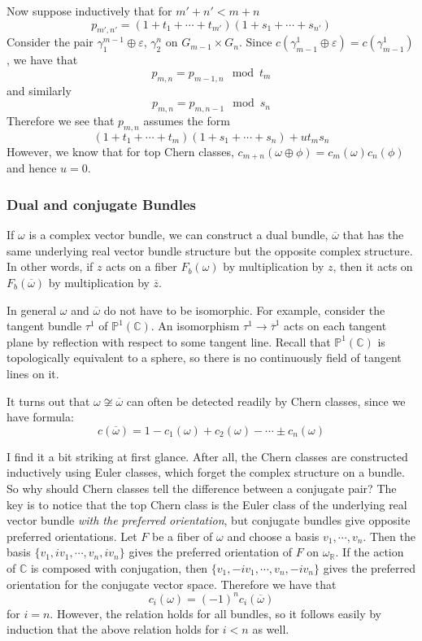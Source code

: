 \documentclass[12pt]{article}
\theoremstyle{plain}
\theoremstyle{definition}
\newcommand{\IC}{\mathbb{C}}
\newcommand{\IP}{\mathbb{P}}
\newcommand{\IR}{\mathbb{R}}
\newcommand{\<}{\langle}
\renewcommand{\>}{\rangle}
\newcommand{\w}{\omega}
\newcommand{\wb}{\overline}
\newcommand{\sm}{\varepsilon}
\begin{document}
Now suppose inductively that for $m' + n' < m + n$
$$ p_{m', n'} = (1 + t_1 + \cdots + t_{m'})(1 + s_1 + \cdots + s_{n'}) $$
Consider the pair $\gamma_1^{m -1} \oplus \sm$, $\gamma_2^n$ on $G_{m - 1} \times G_n$. Since $c(\gamma^1_{m-1} \oplus \sm) = c(\gamma^1_{m-1})$, we have that 
$$ p_{m, n} = p_{m-1, n} \mod t_m $$
and similarly 
$$ p_{m, n} = p_{m, n -1} \mod s_n $$
Therefore we see that $p_{m, n}$ assumes the form 
$$ (1 + t_1 + \cdots + t_m)(1 + s_1 + \cdots + s_n) + ut_m s_n $$
However, we know that for top Chern classes, $c_{m + n}(\w  \oplus \phi) = c_m(\w)c_n(\phi)$ and hence $u = 0$. 

\subsubsection{Dual and conjugate Bundles}
If $\w$ is a complex vector bundle, we can construct a dual bundle, $\wb{\w}$ that has the same underlying real vector bundle structure but the opposite complex structure. In other words, if $z$ acts on a fiber $F_b(\w)$ by multiplication by $z$, then it acts on $F_b(\wb{\w})$ by multiplication by $\wb{z}$. 

In general $\w$ and $\wb{\w}$ do not have to be isomorphic. For example, consider the tangent bundle $\tau^1$ of $\IP^1(\IC)$. An isomorphism $\tau^1 \to \wb{\tau}^1$ acts on each tangent plane by reflection with respect to some tangent line. Recall that $\IP^1(\IC)$ is topologically equivalent to a sphere, so there is no continuously field of tangent lines on it. 

It turns out that $\w \not\cong \wb{\w}$ can often be detected readily by Chern classes, since we have formula:
$$ c(\wb{\w}) = 1 - c_1(\w) + c_2(\w) - \cdots \pm c_n(\w) $$

I find it a bit striking at first glance. After all, the Chern classes are constructed inductively using Euler classes, which forget the complex structure on a bundle. So why should Chern classes tell the difference between a conjugate pair? The key is to notice that the top Chern class is the Euler class of the underlying real vector bundle \textit{with the preferred orientation}, but conjugate bundles give opposite preferred orientations. Let $F$ be a fiber of $\w$ and choose a basis $v_1, \cdots, v_n$. Then the basis $\{v_1, iv_1, \cdots, v_n, iv_n\}$ gives the preferred orientation of $F$ on $\w_\IR$. If the action of $\IC$ is composed with conjugation, then $\{v_1, -iv_1, \cdots, v_n, -iv_n\}$ gives the preferred orientation for the conjugate vector space. Therefore we have that $$c_i(\w) = (-1)^n c_i(\wb{\w})$$ for $i = n$. However, the relation holds for all bundles, so it follows easily by induction that the above relation holds for $i < n$ as well. 
\end{document}
